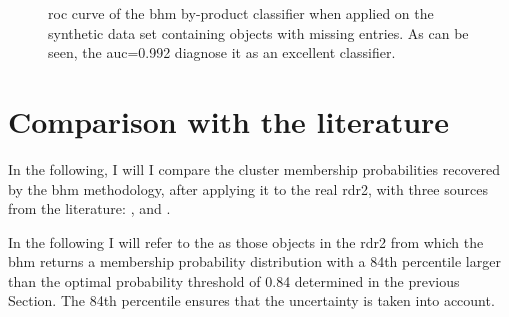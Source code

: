 \begin{figure}[!htp]
\begin{center}
\caption{\gls{roc} curve of the \gls{bhm} by-product classifier when applied on the synthetic data set containing objects with missing entries. As can be seen, the \gls{auc}=0.992 diagnose it as an excellent classifier.}
\label{fig:ROC}
\end{center}
\end{figure}

 
\section{Comparison with the literature}
\label{sect:memberscomparison}

In the following, I will I compare the cluster membership probabilities recovered by the \gls{bhm} methodology, after applying it to the real \gls{rdr2}, with three sources from the literature: \citet{Stauffer2007}, \citet{Bouy2015} and \citet{Rebull2016}.

In the following I will refer to the  as those objects in the \gls{rdr2} from which the \gls{bhm} returns a membership probability distribution with a 84th percentile larger than the optimal probability threshold of 0.84 determined in the previous Section. The 84th percentile ensures that the uncertainty is taken into account.

